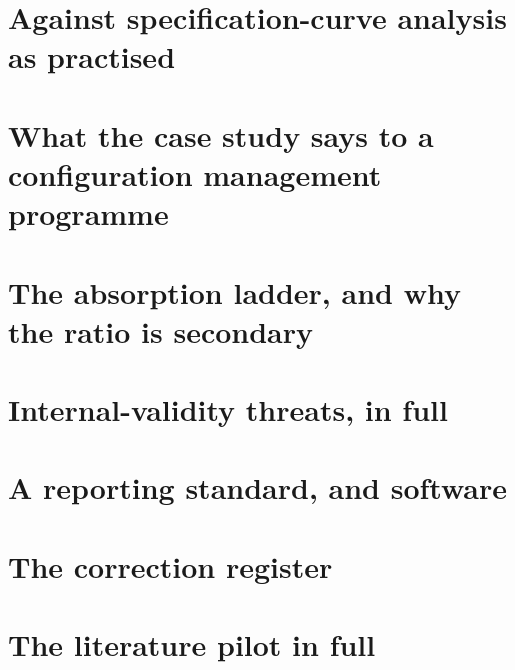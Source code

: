\section{Against specification-curve analysis as practised}
\label{app:sca}


\section{What the case study says to a configuration management programme}
\label{app:programmeread}


\section{The absorption ladder, and why the ratio is secondary}
\label{app:absorption}


\section{Internal-validity threats, in full}
\label{app:threats}


\section{A reporting standard, and software}
\label{app:standard}


\section{The correction register}
\label{app:corrections}


\section{The literature pilot in full}
\label{app:pilot}






